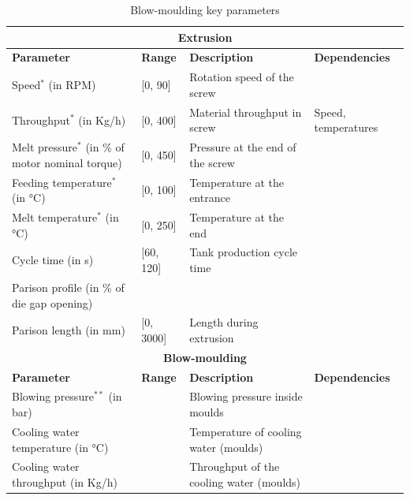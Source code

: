 \begin{landscape}
\begin{table}[]
\caption{Blow-moulding key
parameters}
\label{tab:key_parameters}
\begin{small}
\begin{tabular}{@{}llll@{}}
\toprule
\multicolumn{4}{c}{\textbf{Extrusion}} \\
\midrule
\textbf{Parameter}                     & \textbf{Range}   & \textbf{Description}                                    & \textbf{Dependencies} \\ 
\midrule
Speed$^*$  (in RPM)                               & [0, 90]       & Rotation speed of the screw                               &              \\ 
Throughput$^*$ (in Kg/h)                              & [0, 400]      & Material throughput in screw                 &  Speed, temperatures            \\ 
Melt pressure$^*$ (in \% of motor nominal torque)    & [0, 450]      & Pressure at the end of the screw                 &              \\
Feeding temperature$^*$ (in °C)                               & [0, 100]      & Temperature at the entrance      &              \\
Melt temperature$^*$  (in °C)                                & [0, 250]      & Temperature at the end          &              \\
Cycle time   (in s)                                 & [60, 120]     & Tank production cycle time                                &              \\
Parison profile  (in \% of die gap opening) &               &                                                &              \\
Parison length (in mm)                                & [0, 3000]     & Length during extrusion     &       \\ 
\midrule
\multicolumn{4}{c}{\textbf{Blow-moulding}} \\
\midrule
\textbf{Parameter}                     & \textbf{Range}   & \textbf{Description}                                    & \textbf{Dependencies} \\ 
\midrule
Blowing pressure$^{**}$ (in bar)                               &               & Blowing pressure inside moulds                                               &              \\
Cooling water temperature (in °C)                                &               & Temperature of cooling water (moulds)                                               &               \\
Cooling water throughput (in Kg/h)                              &               & Throughput of the cooling water (moulds)                                               &              \\ 
\bottomrule
\end{tabular}
\end{small}


\end{table}
\end{landscape}
